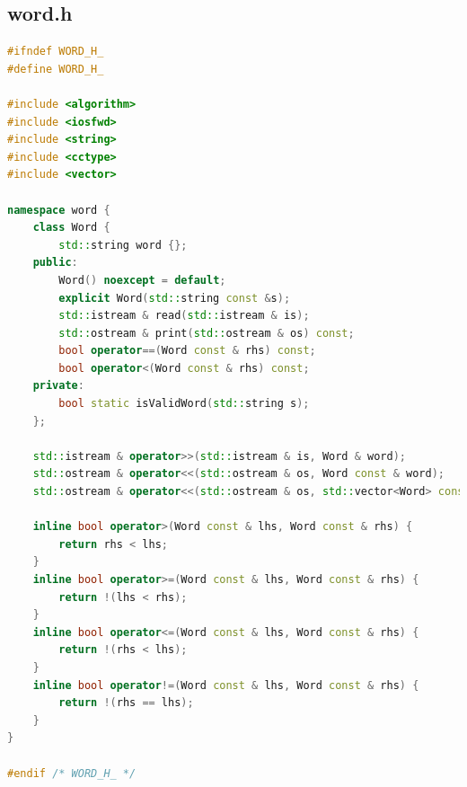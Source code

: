 \subsection{word.h}
\begin{lstlisting}[language=C++]
#ifndef WORD_H_
#define WORD_H_

#include <algorithm>
#include <iosfwd>
#include <string>
#include <cctype>
#include <vector>

namespace word {
	class Word {
		std::string word {};
	public:
		Word() noexcept = default;
		explicit Word(std::string const &s);
		std::istream & read(std::istream & is);
		std::ostream & print(std::ostream & os) const;
		bool operator==(Word const & rhs) const;
		bool operator<(Word const & rhs) const;
	private:
		bool static isValidWord(std::string s);
	};

	std::istream & operator>>(std::istream & is, Word & word);
	std::ostream & operator<<(std::ostream & os, Word const & word);
	std::ostream & operator<<(std::ostream & os, std::vector<Word> const & l);

	inline bool operator>(Word const & lhs, Word const & rhs) {
		return rhs < lhs;
	}
	inline bool operator>=(Word const & lhs, Word const & rhs) {
		return !(lhs < rhs);
	}
	inline bool operator<=(Word const & lhs, Word const & rhs) {
		return !(rhs < lhs);
	}
	inline bool operator!=(Word const & lhs, Word const & rhs) {
		return !(rhs == lhs);
	}
}

#endif /* WORD_H_ */
\end{lstlisting}
